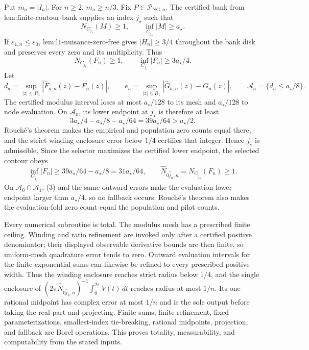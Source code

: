 Put \(m_a=|I_a|\).  For \(n\ge2\), \(m_a\ge n/3\).  Fix \(P\in\mathcal P_{\mathrm{NG},n}\).  The certified bank from \(\text{lem:finite-contour-bank}\) supplies an index \(j_{\star}\) such that
\[
 N_{C_{j_{\star}}}(M)\ge1,
 \qquad \inf_{C_{j_{\star}}}|M|\ge a_{\star}.
\]
If \(\varepsilon_{1,n}\le\varepsilon_0\), \(\text{lem:l1-nuisance-zero-free}\) gives \(|H_n|\ge3/4\) throughout the bank disk and preserves every zero and its multiplicity.  Thus
\[
 N_{C_{j_{\star}}}(F_n)\ge1,
 \qquad \inf_{C_{j_{\star}}}|F_n|\ge3a_{\star}/4. \tag{1}
\]
Let
\[
 d_a=\sup_{|z|\le R_1}|\widehat F_{a,n}(z)-F_n(z)|,
 \qquad
 e_a=\sup_{|z|\le R_1}|\widehat G_{a,n}(z)-G_n(z)|,
 \qquad
 \mathcal A_a=\{d_a\le a_{\star}/8\}.
\]
The certified modulus interval loses at most \(a_{\star}/128\) to its mesh and \(a_{\star}/128\) to node evaluation.  On \(\mathcal A_0\), its lower endpoint at \(j_{\star}\) is therefore at least
\[
 3a_{\star}/4-a_{\star}/8-a_{\star}/64
 =39a_{\star}/64>a_{\star}/2. \tag{2}
\]
Rouch\'e's theorem makes the empirical and population zero counts equal there, and the strict winding enclosure error below \(1/4\) certifies that integer.  Hence \(j_{\star}\) is admissible.  Since the selector maximizes the certified lower endpoint, the selected contour obeys
\[
 \inf_{C_{\widehat j_n}}|F_n|
 \ge39a_{\star}/64-a_{\star}/8
 =31a_{\star}/64,
 \qquad
 \widehat N_{0\widehat j_n,n}=N_{C_{\widehat j_n}}(F_n)\ge1. \tag{3}
\]
On \(\mathcal A_0\cap\mathcal A_1\), (3) and the same outward errors make the evaluation lower endpoint larger than \(a_{\star}/4\), so no fallback occurs.  Rouch\'e's theorem also makes the evaluation-fold zero count equal the population and pilot counts.

Every numerical subroutine is total.  The modulus mesh has a prescribed finite ceiling.  Winding and ratio refinement are invoked only after a certified positive denominator; their displayed observable derivative bounds are then finite, so uniform-mesh quadrature error tends to zero.  Outward evaluation intervals for the finite exponential sums can likewise be refined to every prescribed positive width.  Thus the winding enclosure reaches strict radius below \(1/4\), and the single enclosure of \((2\pi\widehat N_{0\widehat j_n,n})^{-1}\int_0^{2\pi}V(t)\,dt\) reaches radius at most \(1/n\).  Its one rational midpoint has complex error at most \(1/n\) and is the sole output before taking the real part and projecting.  Finite sums, finite refinement, fixed parameterizations, smallest-index tie-breaking, rational midpoints, projection, and fallback are Borel operations.  This proves totality, measurability, and computability from the stated inputs.


